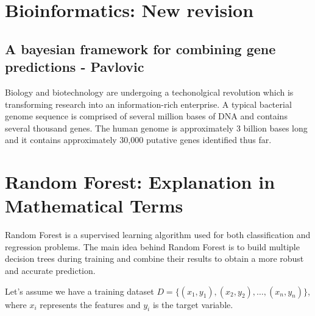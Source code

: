 \documentclass[12pt]{article}
\begin{document}
\section{Bioinformatics: New revision}

\subsection{A bayesian framework for combining gene predictions - Pavlovic}

Biology and biotechnology are undergoing a techonolgical revolution which is transforming research into an information-rich enterprise.  A typical bacterial genome sequence is comprised of several million bases of DNA and contains several thousand genes. The human genome is approximately 3 billion bases long and it contains approximately 30,000 putative genes identified thus far.



\section{Random Forest: Explanation in Mathematical Terms}

Random Forest is a supervised learning algorithm used for both classification and regression problems. The main idea behind Random Forest is to build multiple decision trees during training and combine their results to obtain a more robust and accurate prediction.

Let's assume we have a training dataset \(D = \{(x_1, y_1), (x_2, y_2), \ldots, (x_n, y_n)\}\), where \(x_i\) represents the features and \(y_i\) is the target variable.
\end{document}
